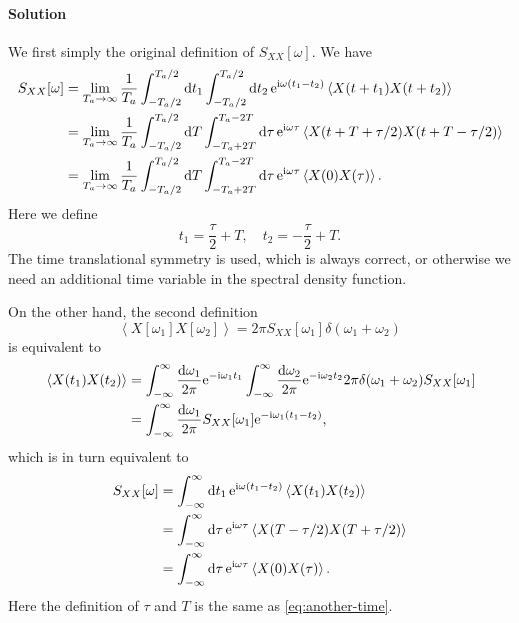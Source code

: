 \documentclass[hyperref, a4paper]{article}
\newcommand*{\ii}{\mathrm{i}}
\newcommand*{\ee}{\mathrm{e}}
\begin{document}
\paragraph{Solution} We first simply the original definition of $S_{XX}[\omega]$. We have 
\begin{equation}
    \begin{aligned}
        S_{XX}[\omega] &= \lim_{T_a \to \infty} \frac{1}{T_a} 
        \int_{-T_a / 2}^{T_a / 2} \dd{t_1} \int_{- T_a / 2}^{T_a / 2} \dd{t_2} 
        \ee^{\ii \omega (t_1 - t_2)} 
        \expval*{X(t + t_1) X(t + t_2)} \\
        &= \lim_{T_a \to \infty} \frac{1}{T_a} 
        \int_{- T_a / 2}^{T_a / 2} \dd{T} \int_{- T_a + 2T}^{T_a - 2T} \dd{\tau}
        \ee^{\ii \omega \tau} \expval*{X(t + T + \tau / 2) X(t + T - \tau / 2)} \\
        &= \lim_{T_a \to \infty} \frac{1}{T_a} 
        \int_{- T_a / 2}^{T_a / 2} \dd{T} \int_{- T_a + 2T}^{T_a - 2T} \dd{\tau}
        \ee^{\ii \omega \tau} \expval*{X(0) X(\tau)}.
    \end{aligned}
    \label{eq:def-1-eq}
\end{equation}
Here we define 
\begin{equation}
    t_1 = \frac{\tau}{2} + T, \quad t_2 = - \frac{\tau}{2} + T.
    \label{eq:another-time}
\end{equation}
The time translational symmetry is used,
which is always correct, or otherwise we need an additional time variable in the spectral density function.

On the other hand, the second definition 
\begin{equation}
    \left\langle X\left[\omega_1\right] X\left[\omega_2\right]\right\rangle=2 \pi S_{X X}\left[\omega_1\right] \delta\left(\omega_1+\omega_2\right)
\end{equation}
is equivalent to 
\[
    \begin{aligned}
        \expval*{X(t_1) X(t_2)} &= 
        \int_{-\infty}^\infty \frac{\dd{\omega_1}}{2\pi} \ee^{- \ii \omega_1 t_1} 
        \int_{-\infty}^\infty \frac{\dd{\omega_2}}{2\pi} \ee^{- \ii \omega_2 t_2} 
        2 \pi \delta(\omega_1 + \omega_2) S_{XX}[\omega_1] \\
        &= \int_{-\infty}^\infty \frac{\dd{\omega_1}}{2\pi} S_{XX}[\omega_1] \ee^{- \ii \omega_1 (t_1 - t_2)},
    \end{aligned}
\]
which is in turn equivalent to 
\begin{equation}
    \begin{aligned}
        S_{XX}[\omega] &= \int_{-\infty}^\infty \dd{t_1} \ee^{\ii \omega (t_1 - t_2)} \expval*{X(t_1) X(t_2)} \\
        &= \int_{-\infty}^\infty \dd{\tau} \ee^{\ii \omega \tau} 
        \expval*{X(T - \tau /2) X(T + \tau / 2)}  \\
        &= \int_{-\infty}^\infty \dd{\tau} \ee^{\ii \omega \tau} \expval*{X(0) X(\tau)} .
    \end{aligned}
    \label{eq:def-2-eq}
\end{equation}
Here the definition of $\tau$ and $T$ is the same as \eqref{eq:another-time}.
\end{document}

